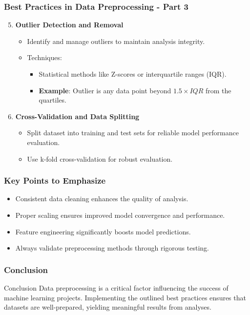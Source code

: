 \documentclass[aspectratio=169]{beamer}
\begin{document}
\begin{frame}[fragile]
    \frametitle{Best Practices in Data Preprocessing - Part 3}
    \begin{enumerate}
        \setcounter{enumi}{4}
        \item \textbf{Outlier Detection and Removal}
        \begin{itemize}
            \item Identify and manage outliers to maintain analysis integrity.
            \item Techniques: 
            \begin{itemize}
                \item Statistical methods like Z-scores or interquartile ranges (IQR).
                \item \textbf{Example}: Outlier is any data point beyond $1.5 \times IQR$ from the quartiles.
            \end{itemize}
        \end{itemize}
        \item \textbf{Cross-Validation and Data Splitting}
        \begin{itemize}
            \item Split dataset into training and test sets for reliable model performance evaluation.
            \item Use k-fold cross-validation for robust evaluation.
        \end{itemize}
    \end{enumerate}
\end{frame}

\begin{frame}
    \frametitle{Key Points to Emphasize}
    \begin{itemize}
        \item Consistent data cleaning enhances the quality of analysis.
        \item Proper scaling ensures improved model convergence and performance.
        \item Feature engineering significantly boosts model predictions.
        \item Always validate preprocessing methods through rigorous testing.
    \end{itemize}
\end{frame}

\begin{frame}
    \frametitle{Conclusion}
    \begin{block}{Conclusion}
        Data preprocessing is a critical factor influencing the success of machine learning projects. Implementing the outlined best practices ensures that datasets are well-prepared, yielding meaningful results from analyses.
    \end{block}
\end{frame}
\end{document}
